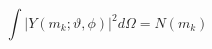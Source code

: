 \begin{equation}
\int \left| Y(m_{k};\vartheta ,\phi )\right| ^{2}d\Omega =N(m_{k})
\end{equation}

